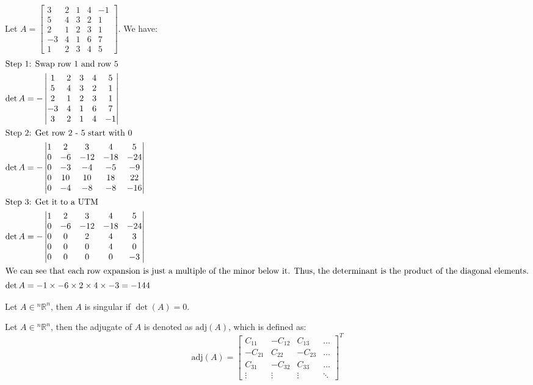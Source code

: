 \documentclass[11pt]{article}
\begin{document}
\begin{example}
    Let $A = \begin{bmatrix} 3 & 2 & 1 & 4 & -1 \\ 5 & 4 & 3 & 2 & 1 \\ 2 & 1 & 2 & 3 & 1 \\ -3 & 4 & 1 & 6 & 7 \\ 1 & 2 & 3 & 4 & 5 \end{bmatrix}$. We have:
    \begin{align*}
        \intertext{Step 1: Swap row 1 and row 5}
        \det A &= -\begin{vmatrix} 1 & 2 & 3 & 4 & 5 \\ 5 & 4 & 3 & 2 & 1 \\ 2 & 1 & 2 & 3 & 1 \\ -3 & 4 & 1 & 6 & 7 \\ 3 & 2 & 1 & 4 & -1 \end{vmatrix} \\
        \intertext{Step 2: Get row 2 - 5 start with 0}
        \det A &= -\begin{vmatrix} 1 & 2 & 3 & 4 & 5 \\ 0 & -6 &-12 & -18 & -24 \\ 0 & -3 & -4 & -5 & -9 \\ 0 & 10 & 10 & 18 & 22 \\ 0 & -4 & -8 & -8 & -16 \end{vmatrix} \\
        \intertext{Step 3: Get it to a UTM}
        \det A &= -\begin{vmatrix} 1 & 2 & 3 & 4 & 5 \\ 0 & -6 &-12 & -18 & -24 \\ 0 & 0 & 2 & 4 & 3 \\ 0 & 0 & 0 & 4 & 0 \\ 0 & 0 & 0 & 0 & -3 \end{vmatrix} \\
        \intertext{We can see that each row expansion is just a multiple of the minor below it. Thus, the determinant is the product of the diagonal elements.}
        \det A &= -1 \times -6 \times 2 \times 4 \times -3 = -144
    \end{align*}
\end{example}
\begin{definition}
    Let $A \in  {^n\mathbb{R}^n}$, then $A$ is singular if $\det(A) = 0$.
\end{definition}
\begin{definition}
    Let $A \in  {^n\mathbb{R}^n}$, then the adjugate of $A$ is denoted as $\text{adj}(A)$, which is defined as:
    \begin{equation}
        \text{adj}(A) = \begin{bmatrix} C_{11} & -C_{12} & C_{13} & \ldots \\ -C_{21} & C_{22} & -C_{23} & \ldots \\ C_{31} & -C_{32} & C_{33} & \ldots \\ \vdots & \vdots & \vdots & \ddots \end{bmatrix}^T
    \end{equation}
\end{definition}
\end{document}
